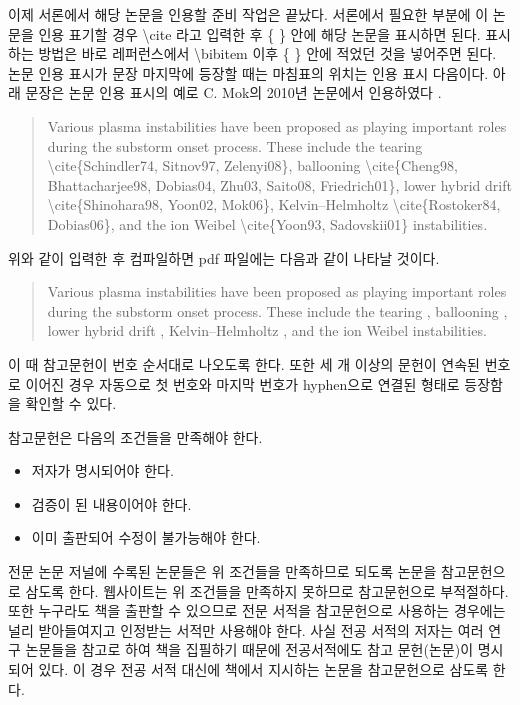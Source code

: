 \documentclass[twoside,11pt]{gshs_thesis}
\begin{document}
이제 서론에서 해당 논문을 인용할 준비 작업은 끝났다. 서론에서 필요한 부분에 이 논문을 인용 표기할 경우 {\textbackslash}cite 라고 입력한 후 \{ \} 안에 해당 논문을 표시하면 된다. 표시하는 방법은 바로 레퍼런스에서 {\textbackslash}bibitem 이후 \{ \} 안에 적었던 것을 넣어주면 된다. 논문 인용 표시가 문장 마지막에 등장할 때는 마침표의 위치는 인용 표시 다음이다. 아래 문장은 논문 인용 표시의 예로 C. Mok의 2010년 논문에서 인용하였다 \cite{Mok10}.
\begin{quote}
Various plasma instabilities have been proposed as playing important roles during the substorm onset process. These include the tearing {\textbackslash}cite\{Schindler74, Sitnov97, Zelenyi08\}, ballooning {\textbackslash}cite\{Cheng98, Bhattacharjee98, Dobias04, Zhu03, Saito08, Friedrich01\}, lower hybrid drift {\textbackslash}cite\{Shinohara98, Yoon02, Mok06\}, Kelvin--Helmholtz {\textbackslash}cite\{Rostoker84, Dobias06\}, and the ion Weibel {\textbackslash}cite\{Yoon93, Sadovskii01\} instabilities.
\end{quote}
위와 같이 입력한 후 컴파일하면 pdf 파일에는 다음과 같이 나타날 것이다.
\begin{quote}
Various plasma instabilities have been proposed as playing important roles during the substorm onset process. These include the tearing \cite{Schindler74, Sitnov97, Zelenyi08}, ballooning \cite{Cheng98, Bhattacharjee98, Dobias04, Zhu03, Saito08, Friedrich01}, lower hybrid drift \cite{Shinohara98, Yoon02, Mok06}, Kelvin--Helmholtz \cite{Rostoker84, Dovias06}, and the ion Weibel \cite{Yoon93, Sadovskii01} instabilities.
\end{quote}
이 때 참고문헌이 번호 순서대로 나오도록 한다. 또한 세 개 이상의 문헌이 연속된 번호로 이어진 경우 자동으로 첫 번호와 마지막 번호가 hyphen으로 연결된 형태로 등장함을 확인할 수 있다.


참고문헌은 다음의 조건들을 만족해야 한다.
\begin{itemize}
\item{저자가 명시되어야 한다.}
\item{검증이 된 내용이어야 한다.}
\item{이미 출판되어 수정이 불가능해야 한다.}
\end{itemize}
전문 논문 저널에 수록된 논문들은 위 조건들을 만족하므로 되도록 논문을 참고문헌으로 삼도록 한다. 웹사이트는 위 조건들을 만족하지 못하므로 참고문헌으로 부적절하다. 또한 누구라도 책을 출판할 수 있으므로 전문 서적을 참고문헌으로 사용하는 경우에는 널리 받아들여지고 인정받는 서적만 사용해야 한다. 사실 전공 서적의 저자는 여러 연구 논문들을 참고로 하여 책을 집필하기 때문에 전공서적에도 참고 문헌(논문)이 명시되어 있다. 이 경우 전공 서적 대신에 책에서 지시하는 논문을 참고문헌으로 삼도록 한다.
\end{document}
